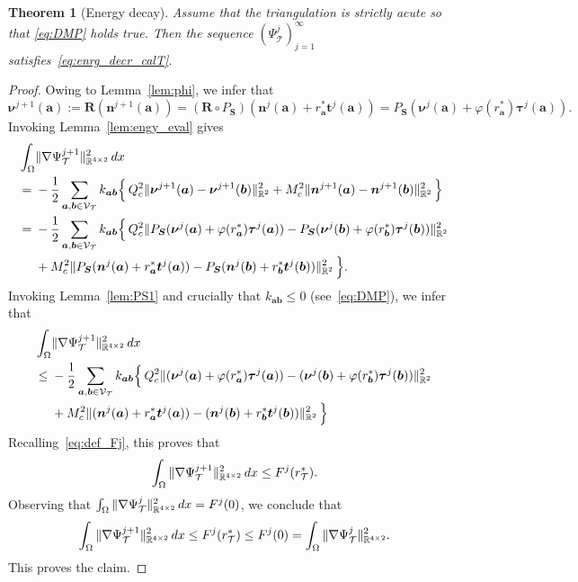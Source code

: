 \documentclass[10pt,a4paper]{amsart}
\newtheorem{theorem}{Theorem}
\newcommand{\Real}{\mathbb{R}}
\newcommand{\bR}{{\boldsymbol R}}
\newcommand{\bS}{{\boldsymbol S}}
\newcommand{\ba}{{\boldsymbol a}}
\newcommand{\bb}{{\boldsymbol b}}
\newcommand{\bn}{{\boldsymbol n}}
\newcommand{\bnu}{{\boldsymbol \nu}}
\newcommand{\bt}{{\boldsymbol t}}
\newcommand{\btau}{{\boldsymbol \tau}}
\newcommand{\calT}{\mathcal{T}}
\newcommand{\calV}{\mathcal{V}}
\newcommand{\disr}{r_\calT}
\newcommand{\dx}{\,{\rm dx}}
\newcommand{\vertex}{\calV_\calT}
\begin{document}
\begin{theorem}[Energy decay] \label{thm:engy-decr-disc}
Assume that the triangulation is strictly acute so that \eqref{eq:DMP} holds true.
Then the sequence $(\Psi_\calT^j)_{j=1}^\infty$ satisfies~\eqref{eq:enrg_decr_calT}. 
\end{theorem}

\begin{proof}
Owing to Lemma~\ref{lem:phi}, we infer that
\[
\bnu^{j+1}(\ba):= \bR(\bn^{j+1}(\ba)) = (\bR \circ P_{\bS})(\bn^j(\ba)+r^*_{\ba}\bt^j(\ba))
=P_{\bS}(\bnu^j(\ba)+\varphi(r^*_{\ba})\btau^j(\ba)).
\]
Invoking Lemma~\ref{lem:engy_eval} gives
\begin{align*}
\int_\Omega &\|\nabla \Psi_\calT^{j+1}\|_{\Real^{4\times2}}^2 \dx \\= {}& - \frac12
\sum_{\ba,\bb\in\vertex} k_{\ba\bb}\Big\{ \, Q_c^2\|\bnu^{j+1}(\ba)-\bnu^{j+1}(\bb)\|_{\Real^2}^2
+ M_c^2\|\bn^{j+1}(\ba)-\bn^{j+1}(\bb)\|_{\Real^2}^2 \, \Big\} \\
={}&  - \frac12
\sum_{\ba,\bb\in\vertex} k_{\ba\bb}\Big\{ \, Q_c^2\|P_{\bS}(\bnu^j(\ba)+\varphi(r^*_{\ba})\btau^j(\ba)) - P_{\bS}(\bnu^j(\bb)+\varphi(r^*_{\bb})\btau^j(\bb))\|_{\Real^2}^2 \\
&+ M_c^2 \|P_{\bS}(\bn^j(\ba)+r^*_{\ba}\bt^j(\ba))-P_{\bS}(\bn^j(\bb)+r^*_{\bb}\bt^j(\bb))\|_{\Real^2}^2 \, \Big\}.
\end{align*}
Invoking Lemma~\ref{lem:PS1} and crucially that $k_{\ba\bb}\le 0$ (see~\eqref{eq:DMP}),
we infer that
\begin{align*}
\int_\Omega &\|\nabla \Psi_\calT^{j+1}\|_{\Real^{4\times2}}^2 \dx \\
\le{}&  - \frac12
\sum_{\ba,\bb\in\vertex} k_{\ba\bb}\Big\{ \, Q_c^2\|(\bnu^j(\ba)+\varphi(r^*_{\ba})\btau^j(\ba)) - (\bnu^j(\bb)+\varphi(r^*_{\bb})\btau^j(\bb))\|_{\Real^2}^2 \\
&+ M_c^2 \|(\bn^j(\ba)+r^*_{\ba}\bt^j(\ba))-(\bn^j(\bb)+r^*_{\bb}\bt^j(\bb))\|_{\Real^2}^2 \, \Big\}
\end{align*}
Recalling~\eqref{eq:def_Fj}, this proves that
\[
\int_\Omega \|\nabla \Psi_\calT^{j+1}\|_{\Real^{4\times2}}^2 \dx \le F^j(\disr^*).
\]
Observing that $\int_\Omega \|\nabla \Psi_\calT^{j}\|_{\Real^{4\times2}}^2 \dx = F^j(0)$,
we conclude that
\[
\int_\Omega \|\nabla \Psi_\calT^{j+1}\|_{\Real^{4\times2}}^2 \dx \le F^j(\disr^*)
\le F^j(0) = \int_\Omega \|\nabla \Psi_\calT^{j}\|_{\Real^{4\times2}}^2.
\]
This proves the claim.
\end{proof}
\end{document}
